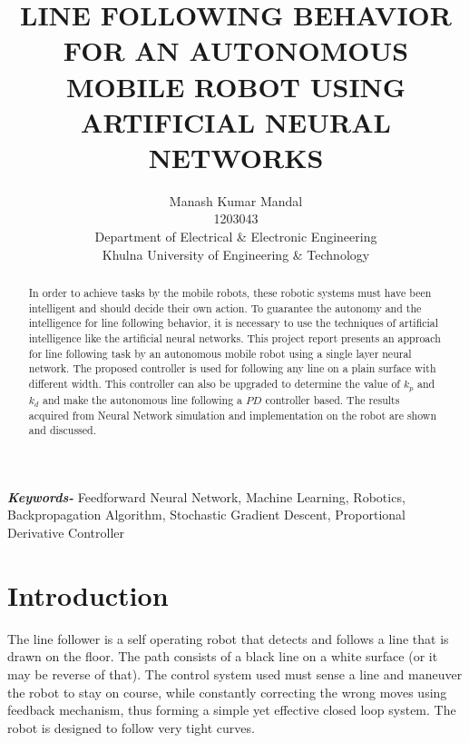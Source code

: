 \documentclass[14pt,a4paper]{extarticle}
\begin{document}
\title{LINE FOLLOWING BEHAVIOR FOR AN AUTONOMOUS MOBILE ROBOT USING ARTIFICIAL NEURAL NETWORKS}

\author{Manash Kumar Mandal\\ 1203043 \\ Department of Electrical \& Electronic Engineering \\ Khulna University of Engineering \& Technology}

\date{}

\maketitle
	

\tableofcontents

\newpage


\begin{abstract}

In order to achieve tasks by the mobile robots, these robotic systems must have been intelligent and should decide their own action. To guarantee the autonomy and the intelligence for line following behavior, it is necessary to use the techniques of artificial intelligence like the artificial neural networks. This project report presents an approach for line following task by an autonomous mobile robot using a single layer neural network. The proposed controller is used for following any line on a plain surface with different width. This controller can also be upgraded to determine the value of $k_{p}$ and $k_{d}$ and make the autonomous line following a $PD$ controller based. The results acquired from Neural Network simulation and implementation on the robot are shown and discussed.

\end{abstract}

\providecommand{\keywords}[1]{\textbf{\textit{Keywords-}} #1}

\keywords{Feedforward Neural Network, Machine Learning, Robotics, Backpropagation Algorithm, Stochastic Gradient Descent, Proportional Derivative Controller}

\section{Introduction}

The line follower is a self operating robot that detects and follows a line that is drawn on the floor. The path consists of a black line on a white surface (or it may be reverse of that). The control system used must sense a line and maneuver the robot to stay on course, while constantly correcting the wrong moves using feedback mechanism, thus forming a simple yet effective closed loop system. The robot is designed to follow very tight curves. 
\end{document}
